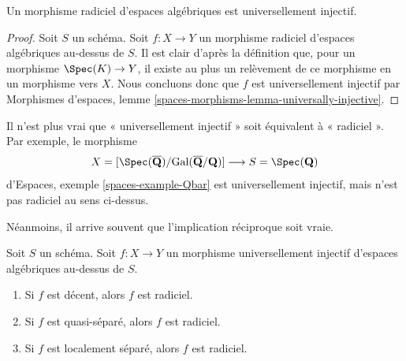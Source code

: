 \begin{lemma}
\label{lemma-radicial-implies-universally-injective}
Un morphisme radiciel d'espaces algébriques est universellement injectif.
\end{lemma}

\begin{proof}
Soit $S$ un schéma. Soit $f : X \to Y$ un morphisme radiciel
d'espaces algébriques au-dessus de $S$.
Il est clair d'après la définition que, pour un morphisme
$\Spec(K) \to Y$, il existe au plus un relèvement de ce morphisme
en un morphisme vers $X$. Nous concluons donc que $f$ est universellement
injectif par
Morphismes d'espaces,
lemme \ref{spaces-morphisms-lemma-universally-injective}.
\end{proof}

\begin{example}
\label{example-universally-injective-not-radicial}
Il n'est plus vrai que « universellement injectif » soit équivalent à « radiciel ».
Par exemple, le morphisme
$$
X = [\Spec(\overline{\mathbf{Q}})/
\text{Gal}(\overline{\mathbf{Q}}/\mathbf{Q})]
\longrightarrow
S = \Spec(\mathbf{Q})
$$
d'Espaces,
exemple \ref{spaces-example-Qbar}
est universellement injectif, mais n'est pas radiciel au sens ci-dessus.
\end{example}

\noindent
Néanmoins, il arrive souvent que l'implication réciproque soit vraie.

\begin{lemma}
\label{lemma-when-universally-injective-radicial}
Soit $S$ un schéma. Soit $f : X \to Y$ un morphisme universellement injectif
d'espaces algébriques au-dessus de $S$.
\begin{enumerate}
\item Si $f$ est décent, alors $f$ est radiciel.
\item Si $f$ est quasi-séparé, alors $f$ est radiciel.
\item Si $f$ est localement séparé, alors $f$ est radiciel.
\end{enumerate}
\end{lemma}

